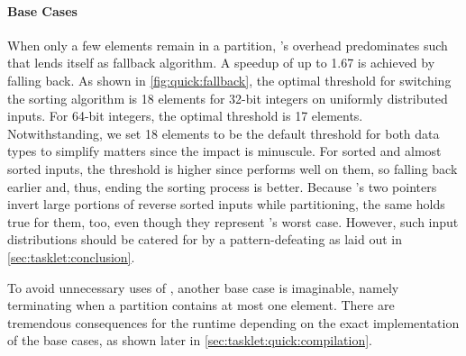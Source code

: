 \paragraph{Base Cases}
When only a few elements remain in a partition, \QS{}'s overhead predominates such that \IS{} lends itself as fallback algorithm.
A speedup of up to \num{1.67} is achieved by falling back.
As shown in \cref{fig:quick:fallback}, the optimal threshold for switching the sorting algorithm is 18 elements for 32-bit integers on uniformly distributed inputs.
For 64-bit integers, the optimal threshold is 17 elements.
Notwithstanding, we set 18 elements to be the default threshold for both data types to simplify matters since the impact is minuscule.
For sorted and almost sorted inputs, the threshold is higher since \IS{} performs well on them, so falling back earlier and, thus, ending the sorting process is better.
Because \QS{}'s two pointers invert large portions of reverse sorted inputs while partitioning, the same holds true for them, too, even though they represent \IS{}'s worst case.
However, such input distributions should be catered for by a pattern-defeating \QS{} as laid out in \cref{sec:tasklet:conclusion}.

To avoid unnecessary uses of \IS{}, another base case is imaginable, namely terminating when a partition contains at most one element.
There are tremendous consequences for the runtime depending on the exact implementation of the base cases, as shown later in \cref{sec:tasklet:quick:compilation}.

